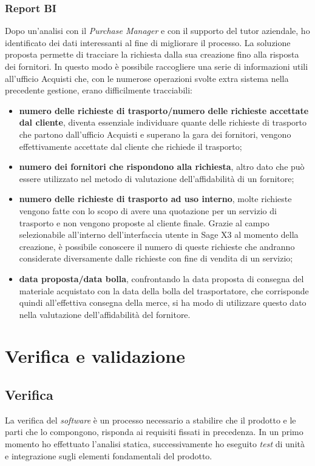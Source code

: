 \subsubsection{Report BI}
Dopo un'analisi con il \textit{Purchase Manager} e con il supporto del tutor aziendale, ho identificato dei dati interessanti al fine di migliorare il processo.
La soluzione proposta permette di tracciare la richiesta dalla sua creazione fino alla risposta dei fornitori. In questo modo è possibile raccogliere una serie di informazioni utili all'ufficio Acquisti che, con le numerose operazioni svolte extra sistema nella precedente gestione, erano difficilmente tracciabili:
\begin{itemize}
	\item \textbf{numero delle richieste di trasporto/numero delle richieste accettate dal cliente}, diventa essenziale individuare quante delle richieste di trasporto che partono dall'ufficio Acquisti e superano la gara dei fornitori, vengono effettivamente accettate dal cliente che richiede il trasporto;
	\item \textbf{numero dei fornitori che rispondono alla richiesta}, altro dato che può essere utilizzato nel metodo di valutazione dell'affidabilità di un fornitore;
	\item \textbf{numero delle richieste di trasporto ad uso interno}, molte richieste vengono fatte con lo scopo di avere una quotazione per un servizio di trasporto e non vengono proposte al cliente finale. Grazie al campo selezionabile all'interno dell'interfaccia utente in Sage X3  al momento della creazione, è possibile conoscere il numero di queste richieste che andranno considerate diversamente dalle richieste con fine di vendita di un servizio;
	\item \textbf{data proposta/data bolla}, confrontando la data proposta di consegna del materiale acquistato con la data della bolla del trasportatore, che corrisponde quindi all'effettiva consegna della merce, si ha modo di utilizzare questo dato nella valutazione dell'affidabilità del fornitore.
\end{itemize}





\section{Verifica e validazione}

\subsection{Verifica}
La verifica del \textit{software} è un processo necessario a stabilire che il prodotto e le parti che lo compongono, risponda ai requisiti fissati in precedenza.
In un primo momento ho effettuato l'analisi statica, successivamente ho eseguito \textit{test} di unità e integrazione sugli elementi fondamentali del prodotto.



